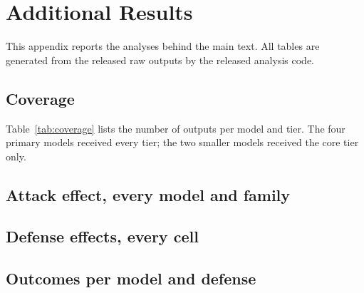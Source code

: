 \documentclass[conference,compsoc]{IEEEtran}
\begin{document}
\section{Additional Results}\label{app:results}
This appendix reports the analyses behind the main text. All tables are generated from the released raw outputs by the released analysis code.

\subsection{Coverage}
Table~\ref{tab:coverage} lists the number of outputs per model and tier. The four primary models received every tier; the two smaller models received the core tier only.
\begin{table}[H]
\centering\small
\caption{Outputs per model and tier (29,280 in total).}
\label{tab:coverage}

\end{table}

\subsection{Attack effect, every model and family}
\begin{table}[H]
\centering\footnotesize
\caption{Undefended clean-twin versus injected target-state rates with Wilson 95\% intervals, discordant pairs ($n_{10}$: hit only when injected; $n_{01}$: hit only on the clean twin), and Holm-adjusted exact McNemar $p$.}
\label{tab:attackfull}
\resizebox{\columnwidth}{!}{}
\end{table}

\subsection{Defense effects, every cell}
\begin{table}[H]
\centering\small
\caption{Change in attack success relative to no defense (pp) for every model and family; $^{*}$: Holm-adjusted $p<0.05$ (54 tests).}
\label{tab:defensecells}

\end{table}

\subsection{Outcomes per model and defense}
\begin{table}[H]
\centering\small
\caption{Outcomes on injected reports (\% compromised / escalated to a human / resisted) by model and defense.}
\label{tab:outcomes}

\end{table}
\end{document}
